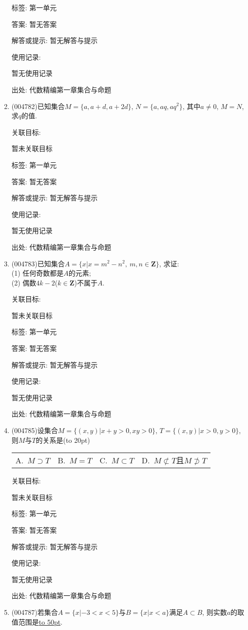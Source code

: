 \documentclass[10pt,a4paper]{article}
\newcommand{\blank}[1]{\underline{\hbox to #1pt{}}}
\newcommand{\bracket}[1]{(\hbox to #1pt{})}
\newcommand{\fourch}[4]{\par\begin{tabular}{p{.23\textwidth}p{.23\textwidth}p{.23\textwidth}p{.23\textwidth}}
A.~#1 &B.~#2& C.~#3& D.~#4
\end{tabular}}
\begin{document}
\begin{enumerate}[1.]
标签: 第一单元

答案: 暂无答案

解答或提示: 暂无解答与提示

使用记录:

暂无使用记录


出处: 代数精编第一章集合与命题
\item { (004782)}已知集合$M=\{a,a+d,a+2d\}$, $N=\{a,aq,aq^2\}$, 其中$a\ne 0$, $M=N$, 求$q$的值.


关联目标:

暂未关联目标



标签: 第一单元

答案: 暂无答案

解答或提示: 暂无解答与提示

使用记录:

暂无使用记录


出处: 代数精编第一章集合与命题
\item { (004783)}已知集合$A=\{x|x=m^2-n^2, \ m,n\in \mathbf{Z}\}$, 求证:\\
(1) 任何奇数都是$A$的元素;\\
(2) 偶数$4k-2$($k\in \mathbf{Z}$)不属于$A$.


关联目标:

暂未关联目标



标签: 第一单元

答案: 暂无答案

解答或提示: 暂无解答与提示

使用记录:

暂无使用记录


出处: 代数精编第一章集合与命题
\item { (004785)}设集合$M=\{ (x,y)| x+y>0,xy>0 \}$, $T=\{ (x,y)| x>0,y>0 \}$, 则$M$与$T$的关系是\bracket{20}
\fourch{$M\supset T$}{$M=T$}{$M\subset T$}{$M\not\subset T$且$M\not\supset T$}


关联目标:

暂未关联目标



标签: 第一单元

答案: 暂无答案

解答或提示: 暂无解答与提示

使用记录:

暂无使用记录


出处: 代数精编第一章集合与命题
\item { (004787)}若集合$A=\{x|-3<x<5\}$与$B=\{x|x<a\}$满足$A\subset B$, 则实数$a$的取值范围是\blank{50}.



\end{enumerate}
\end{document}
